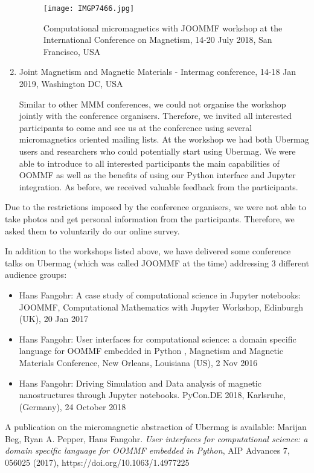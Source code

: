 \documentclass{deliverablereport}
\begin{document}
\begin{enumerate}
    \begin{figure}
      \texttt{[image: IMGP7466.jpg]}
  \caption{\label{fig:icm-workshop} Computational micromagnetics with
    JOOMMF workshop at the International Conference on Magnetism,
    14-20 July 2018, San Francisco, USA}
    \end{figure}

\item Joint Magnetism and Magnetic Materials - Intermag conference,
14-18 Jan 2019, Washington DC, USA

    Similar to other MMM conferences, we could not organise the
workshop jointly with the conference organisers. Therefore, we invited
all interested participants to come and see us at the conference using
several micromagnetics oriented mailing lists. At the workshop we had
both Ubermag users and researchers who could potentially start using
Ubermag. We were able to introduce to all interested participants the
main capabilities of OOMMF as well as the benefits of using our Python
interface and Jupyter integration. As before, we received valuable
feedback from the participants.

\end{enumerate}

Due to the restrictions imposed by the conference organisers, we were
not able to take photos and get personal information from the
participants. Therefore, we asked them to voluntarily do our online
survey.

In addition to the workshops listed above, we have delivered some conference
talks on Ubermag (which was called JOOMMF at the time) addressing 3
different audience groups:
\begin{itemize}
\item Hans Fangohr: A case study of computational science in Jupyter
  notebooks: JOOMMF, Computational Mathematics with Jupyter Workshop,
  Edinburgh (UK), 20 Jan 2017
\item Hans Fangohr: User interfaces for computational science: a
  domain specific language for OOMMF embedded in Python , Magnetism
  and Magnetic Materials Conference, New Orleans, Louisiana (US), 2
  Nov 2016
\item Hans Fangohr: Driving Simulation and Data analysis of magnetic
  nanostructures through Jupyter notebooks. PyCon.DE 2018, Karlsruhe,
  (Germany), 24 October 2018
\end{itemize}

A publication on the micromagnetic abstraction of Ubermag is
available: Marijan Beg, Ryan A. Pepper, Hans Fangohr. \emph{User interfaces for
  computational science: a domain specific language for OOMMF embedded
  in Python}, AIP Advances 7, 056025 (2017), https://doi.org/10.1063/1.4977225
\end{document}
